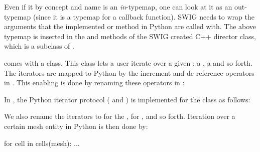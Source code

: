 \noindent Even if it by concept and name is an \textit{in}-typemap, one can look at
it as an out-typemap (since it is a typemap for a callback function). SWIG
needs to wrap the arguments that the implemented  or 
method in Python are called with. The above typemap is inserted in the
 and  methods of the SWIG created C++ director class,
which is a subclass of .

\dolfin comes with a \-\- class. This
class lets a user iterate over a given : a ,
a  and so forth. The iterators are mapped to Python by the
increment and de-reference operators in . This
enabling is done by renaming these operators in :\vspace*{3pt}
\begin{swigcode}
\end{swigcode}

\pagebreak

\noindent In , the Python iterator
protocol ( and ) is implemented for the\break
{} class as
follows:\vspace*{3pt}

\vspace*{5pt}

\noindent We also rename the iterators to  for the ,  for , and so forth. Iteration over a certain mesh entity in Python is then done by:\vspace*{3pt}
\begin{python}
for cell in cells(mesh):
    ...
\end{python}


\vspace*{3pt}
